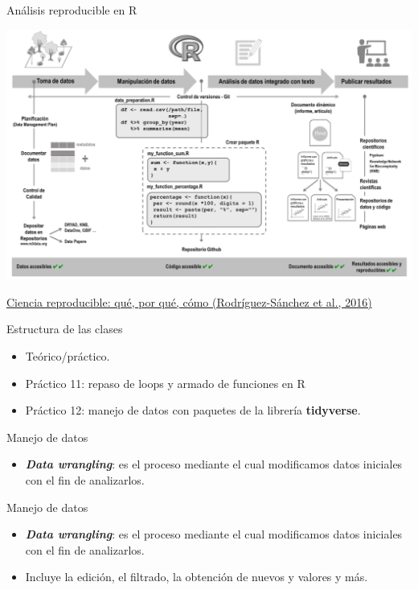 \documentclass[ignorenonframetext,]{beamer}
\providecommand{\tightlist}{%
  \setlength{\itemsep}{0pt}\setlength{\parskip}{0pt}}
\begin{document}
\begin{frame}{Análisis reproducible en R}
\protect\hypertarget{anuxe1lisis-reproducible-en-r}{}

\includegraphics{analytic_process_R.png}

\href{}{Ciencia reproducible: qué, por qué, cómo (Rodríguez-Sánchez et
al., 2016)}

\end{frame}

\begin{frame}{Estructura de las clases}
\protect\hypertarget{estructura-de-las-clases}{}

\begin{itemize}
\tightlist
\item
  Teórico/práctico.
\item
  Práctico 11: repaso de loops y armado de funciones en R
\item
  Práctico 12: manejo de datos con paquetes de la librería
  \textbf{tidyverse}.
\end{itemize}

\end{frame}

\begin{frame}{Manejo de datos}
\protect\hypertarget{manejo-de-datos}{}

\begin{itemize}
\tightlist
\item
  \textbf{\emph{Data wrangling}}: es el proceso mediante el cual
  modificamos datos iniciales con el fin de analizarlos.
\end{itemize}

\end{frame}

\begin{frame}{Manejo de datos}
\protect\hypertarget{manejo-de-datos-1}{}

\begin{itemize}
\tightlist
\item
  \textbf{\emph{Data wrangling}}: es el proceso mediante el cual
  modificamos datos iniciales con el fin de analizarlos.
\item
  Incluye la edición, el filtrado, la obtención de nuevos y valores y
  más.
\end{itemize}

\end{frame}
\end{document}
